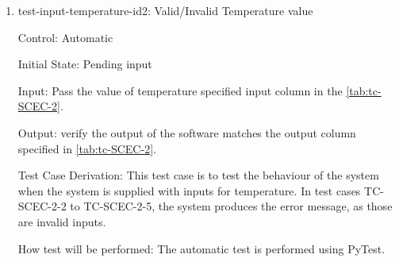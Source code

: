 \documentclass[12pt, titlepage]{article}
\begin{document}
\begin{center}
\begin{table}[h!]
\caption{TC-SCEC-2 - Temperature input constraints tests}
\label{tab:tc-SCEC-2}
\end{table}
\end{center}

\begin{enumerate}   

\item{test-input-temperature-id2: Valid/Invalid Temperature value  \\}

Control: Automatic
					
Initial State: Pending input 
					
Input: Pass the value of temperature specified input column in the \autoref{tab:tc-SCEC-2}.
					
Output: verify the output of the software matches the output column specified in \autoref{tab:tc-SCEC-2}. 

Test Case Derivation: This test case is to test the behaviour of the system when the system is supplied with inputs for temperature. In test cases TC-SCEC-2-2 to TC-SCEC-2-5, the system produces the error message, as those are invalid inputs. 
					
How test will be performed: The automatic test is performed using PyTest.  


					

\end{enumerate}
\end{document}
